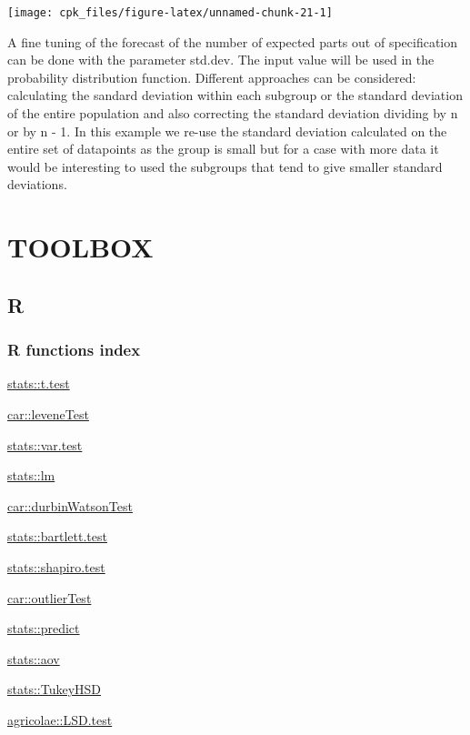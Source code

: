 \documentclass[
]{book}
\begin{document}
\texttt{[image: cpk\_files/figure-latex/unnamed-chunk-21-1]}

A fine tuning of the forecast of the number of expected parts out of specification can be done with the parameter std.dev. The input value will be used in the probability distribution function. Different approaches can be considered: calculating the sandard deviation within each subgroup or the standard deviation of the entire population and also correcting the standard deviation dividing by n or by n - 1. In this example we re-use the standard deviation calculated on the entire set of datapoints as the group is small but for a case with more data it would be interesting to used the subgroups that tend to give smaller standard deviations.

\hypertarget{part-toolbox}{%
\part{TOOLBOX}\label{part-toolbox}}

\hypertarget{r}{%
\chapter{R}\label{r}}

\hypertarget{r-functions-index}{%
\section{R functions index}\label{r-functions-index}}

\protect\hyperlink{tTest}{stats::t.test}

\protect\hyperlink{leveneTest}{car::leveneTest}

\protect\hyperlink{FTest}{stats::var.test}

\protect\hyperlink{linearModel}{stats::lm}

\href{\%7B\#residualsCorrelation\%7D}{car::durbinWatsonTest}

\protect\hyperlink{barlettTest}{stats::bartlett.test}

\protect\hyperlink{shapiroTest}{stats::shapiro.test}

\protect\hyperlink{outlierTest}{car::outlierTest}

\protect\hyperlink{predict}{stats::predict}

\protect\hyperlink{anova}{stats::aov}

\protect\hyperlink{tukeyTest}{stats::TukeyHSD}

\protect\hyperlink{fisherLSD}{agricolae::LSD.test}
\end{document}
